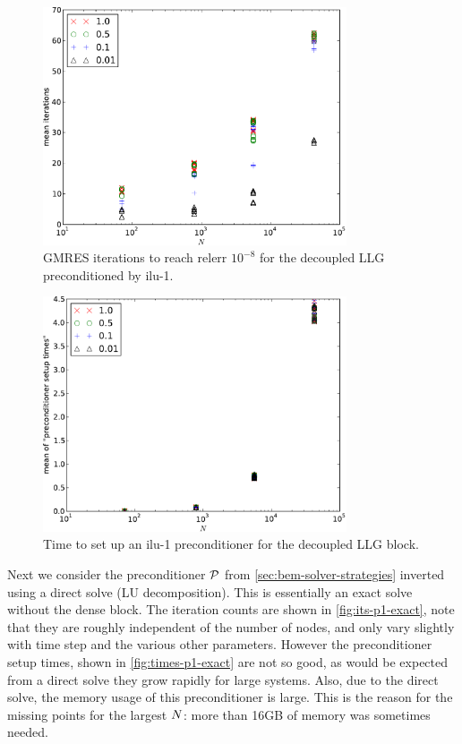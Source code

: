 \begin{figure}
  \centering
  \includegraphics[width=0.8\textwidth]{plots/linear_solvers/ilu-1decoupleddummy-meanofnsolveritersvsinitialnnode.pdf}
  \caption{GMRES iterations to reach relerr $10^{-8}$ for the decoupled LLG preconditioned by ilu-1.}
  \label{fig:its-ilu-decoupled}
\end{figure}

\begin{figure}
  \centering
  \includegraphics[width=0.8\textwidth]{plots/linear_solvers/ilu-1decoupleddummy-meanofpreconditionersetuptimesvsinitialnnode.pdf}
  \caption{Time to set up an ilu-1 preconditioner for the decoupled LLG block.}
  \label{fig:times-ilu-decoupled}
\end{figure}


Next we consider the preconditioner $\mathcal{P}$ from \cref{sec:bem-solver-strategies} inverted using a direct solve (LU decomposition).
This is essentially an exact solve without the dense block.
The iteration counts are shown in \cref{fig:its-p1-exact}, note that they are roughly independent of the number of nodes, and only vary slightly with time step and the various other parameters.
However the preconditioner setup times, shown in \cref{fig:times-p1-exact} are not so good, as would be expected from a direct solve they grow rapidly for large systems.
Also, due to the direct solve, the memory usage of this preconditioner is large.
This is the reason for the missing points for the largest $N$: more than 16GB of memory was sometimes needed.

